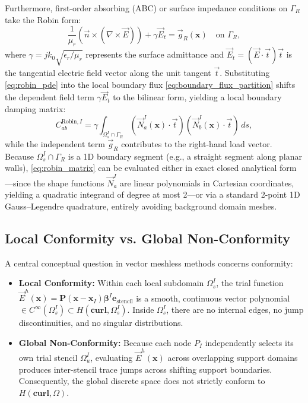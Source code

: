 \documentclass[preprint,12pt]{elsarticle}
\begin{document}
Furthermore, first-order absorbing (ABC) or surface impedance conditions on $\Gamma_R$ take the Robin form:
\begin{equation}
    \frac{1}{\mu_r} \left( \vec{n} \times (\nabla \times \vec{E}) \right) + \gamma \vec{E}_t = \vec{g}_R(\mathbf{x}) \quad \text{on } \Gamma_R,
    \label{eq:robin_pde}
\end{equation}
where $\gamma = j k_0 \sqrt{\epsilon_r / \mu_r}$ represents the surface admittance and $\vec{E}_t = (\vec{E} \cdot \vec{t})\vec{t}$ is the tangential electric field vector along the unit tangent $\vec{t}$. Substituting \eqref{eq:robin_pde} into the local boundary flux \eqref{eq:boundary_flux_partition} shifts the dependent field term $\gamma \vec{E}_t$ to the bilinear form, yielding a local boundary damping matrix:
\begin{equation}
    C_{ab}^{\mathrm{Robin}, I} = \gamma \int_{\Omega_s^I \cap \Gamma_R} \left( \vec{N}_a^I(\mathbf{x}) \cdot \vec{t} \right) \left( \vec{N}_b^I(\mathbf{x}) \cdot \vec{t} \right) \, ds,
    \label{eq:robin_matrix}
\end{equation}
while the independent term $\vec{g}_R$ contributes to the right-hand load vector. Because $\Omega_s^I \cap \Gamma_R$ is a 1D boundary segment (e.g., a straight segment along planar walls), \eqref{eq:robin_matrix} can be evaluated either in exact closed analytical form---since the shape functions $\vec{N}_a^I$ are linear polynomials in Cartesian coordinates, yielding a quadratic integrand of degree at most 2---or via a standard 2-point 1D Gauss--Legendre quadrature, entirely avoiding background domain meshes.

\subsection{Local Conformity vs. Global Non-Conformity}
\label{subsec:conformity_discussion}

A central conceptual question in vector meshless methods concerns conformity:
\begin{itemize}
    \item \textbf{Local Conformity:} Within each local subdomain $\Omega_s^I$, the trial function $\vec{E}^h(\mathbf{x}) = \mathbf{P}(\mathbf{x} - \mathbf{x}_I) \boldsymbol{\beta}^I \mathbf{e}_{\mathrm{stencil}}$ is a smooth, continuous vector polynomial $\in C^\infty(\Omega_s^I) \subset H(\mathbf{curl}, \Omega_s^I)$. Inside $\Omega_s^I$, there are no internal edges, no jump discontinuities, and no singular distributions.
    \item \textbf{Global Non-Conformity:} Because each node $P_I$ independently selects its own trial stencil $\Omega_u^I$, evaluating $\vec{E}^h(\mathbf{x})$ across overlapping support domains produces inter-stencil trace jumps across shifting support boundaries. Consequently, the global discrete space does not strictly conform to $H(\mathbf{curl}, \Omega)$.
\end{itemize}
\end{document}
